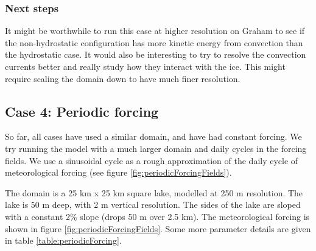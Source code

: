 \documentclass[11pt]{article}
\begin{document}
\subsubsection{Next steps}
It might be worthwhile to run this case at higher resolution on Graham to see if the non-hydrostatic configuration has more kinetic energy from convection than the hydrostatic case. It would also be interesting to try to resolve the convection currents better and really study how they interact with the ice. This might require scaling the domain down to have much finer resolution.

\subsection{Case 4: Periodic forcing}
So far, all cases have used a similar domain, and have had constant forcing. We try running the model with a much larger domain and daily cycles in the forcing fields. We use a sinusoidal cycle as a rough approximation of the daily cycle of meteorological forcing (see figure \ref{fig:periodicForcingFields}).

The domain is a 25 km x 25 km square lake, modelled at 250 m resolution. The lake is 50 m deep, with 2 m vertical resolution. The sides of the lake are sloped with a constant 2\% slope (drops 50 m over 2.5 km). The meteorological forcing is shown in figure \ref{fig:periodicForcingFields}. Some more parameter details are given in table \ref{table:periodicForcing}.
\end{document}
